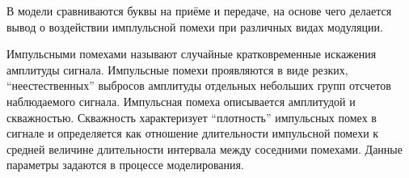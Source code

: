 \documentclass[12pt, russian, oneside, article]{ncc}
\begin{document}
В модели сравниваются буквы на приёме и передаче, на основе чего делается вывод о воздействии имплульсной помехи при различных видах модуляции.

Импульсными помехами называют случайные кратковременные искажения амплитуды сигнала. Импульсные помехи проявляются в виде резких, ``неестественных'' выбросов амплитуды отдельных небольших групп отсчетов наблюдаемого сигнала. Импульсная помеха описывается амплитудой и скважностью. Скважность характеризует ``плотность'' импульсных помех в сигнале и определяется как отношение длительности импульсной помехи к средней величине длительности интервала между соседними помехами. Данные параметры задаются в процессе моделирования.
\end{document}
